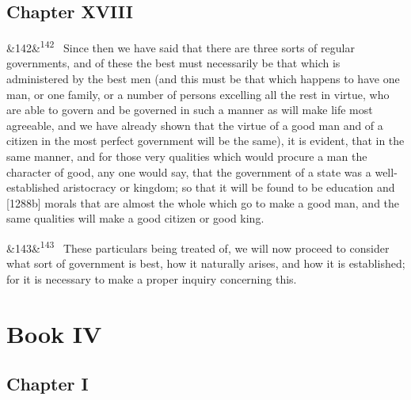 \documentclass[12pt]{article}
\newcommand{\para}[1][]{\par\noindent\ifx&#1&\else\textsuperscript{\footnotesize #1}~\fi}
\begin{document}
\subsection*{Chapter XVIII}

\para[142] Since then we have said that there are three sorts of regular governments, and of these the best must necessarily be that which is administered by the best men (and this must be that which happens to have one man, or one family, or a number of persons excelling all the rest in virtue, who are able to govern and be governed in such a manner as will make life most agreeable, and we have already shown that the virtue of a good man and of a citizen in the most perfect government will be the same), it is evident, that in the same manner, and for those very qualities which would procure a man the character of good, any one would say, that the government of a state was a well-established aristocracy or kingdom; so that it will be found to be education and [1288b] morals that are almost the whole which go to make a good man, and the same qualities will make a good citizen or good king.

\para[143] These particulars being treated of, we will now proceed to consider what sort of government is best, how it naturally arises, and how it is established; for it is necessary to make a proper inquiry concerning this.

\section*{Book IV}

\subsection*{Chapter I}
\end{document}
